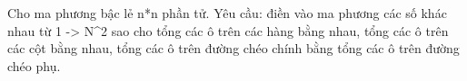 Cho ma phương bậc lẻ n*n phần tử. Yêu cầu: điền vào ma phương các số khác nhau từ 1 -> N\textasciicircum2 sao cho tổng các ô trên các hàng bằng nhau, tổng các ô trên các cột bằng nhau, tổng các ô trên đường chéo chính bằng tổng các ô trên đường chéo phụ.